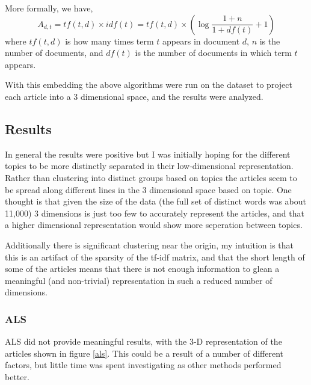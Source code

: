 \documentclass[12pt]{article}
\begin{document}
More formally, we have,
\[
    A_{d, t} = tf(t, d)\times idf(t) = tf(t,d)\times (\log \frac{1 + n}{1 + df(t)} + 1)
\]
where $tf(t,d)$ is how many times term $t$ appears in document $d$, $n$ is the number of documents, and $df(t)$ is the number of documents in which term $t$ appears.

With this embedding the above algorithms were run on the dataset to project each article into a 3 dimensional space, and the results were analyzed.

\subsection*{Results}

In general the results were positive but I was initially hoping for the different topics to be more distinctly separated in their low-dimensional representation. Rather than clustering into distinct groups based on topics the articles seem to be spread along different lines in the 3 dimensional space based on topic. One thought is that given the size of the data (the full set of distinct words was about 11,000) 3 dimensions is just too few to accurately represent the articles, and that a higher dimensional representation would show more seperation between topics.

Additionally there is significant clustering near the origin, my intuition is that this is an artifact of the sparsity of the tf-idf matrix, and that the short length of some of the articles means that there is not enough information to glean a meaningful (and non-trivial) representation in such a reduced number of dimensions.

\subsubsection*{ALS}

ALS did not provide meaningful results, with the 3-D representation of the articles shown in figure \ref{als}. This could be a result of a number of different factors, but little time was spent investigating as other methods performed better.
\end{document}
